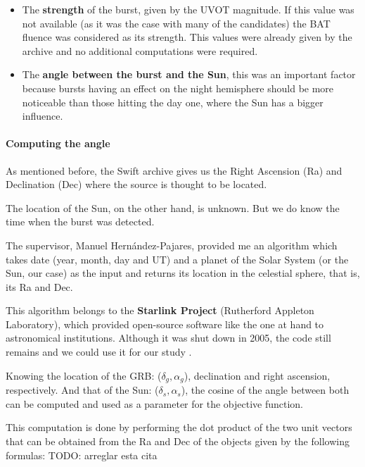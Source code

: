 \begin{itemize}

\item The \textbf{strength} of the burst, given by the UVOT magnitude. If this value was not available (as it was the case with many of the candidates) the BAT fluence was considered as its strength. This values were already given by the archive and no additional computations were required.

\item The \textbf{angle between the burst and the Sun}, this was an important factor because bursts having an effect on the night hemisphere should be more noticeable than those hitting the day one, where the Sun has a bigger influence.

\end{itemize}

\paragraph{Computing the angle}

As mentioned before, the Swift archive gives us the Right Ascension (Ra) and Declination (Dec) where the source is thought to be located.

The location of the Sun, on the other hand, is unknown. But we do know the time when the burst was detected.

The supervisor, Manuel Hernández-Pajares, provided me an algorithm which takes date (year, month, day and UT) and a planet of the Solar System (or the Sun, our case) as the input and returns its location in the celestial sphere, that is, its Ra and Dec. 

This algorithm belongs to the \textbf{Starlink Project} (Rutherford Appleton Laboratory), which provided open-source software like the one at hand to astronomical institutions. Although it was shut down in 2005, the code still remains and we could use it for our study \cite{starlinkproject}.

Knowing the location of the GRB: ($\delta_{g}, \alpha_{g}$), declination and right ascension, respectively. And that of the Sun: ($\delta_{s}, \alpha_{s}$), the cosine of the angle between both can be computed and used as a parameter for the objective function.

This computation is done by performing the dot product of the two unit vectors that can be obtained from the Ra and Dec of the objects given by the following formulas: \cite{de donde salen las formulas}  TODO: arreglar esta cita

